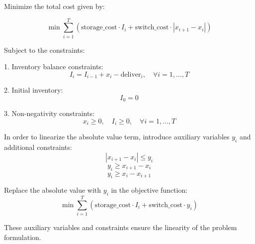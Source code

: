 \documentclass{article}
\begin{document}
Minimize the total cost given by:

\[
\min \sum_{i=1}^{T} \left( \text{storage\_cost} \cdot I_i + \text{switch\_cost} \cdot |x_{i+1} - x_i| \right)
\]

Subject to the constraints:

1. Inventory balance constraints:
   \[
   I_i = I_{i-1} + x_i - \text{deliver}_i, \quad \forall i = 1, \ldots, T
   \]

2. Initial inventory:
   \[
   I_0 = 0
   \]

3. Non-negativity constraints:
   \[
   x_i \geq 0, \quad I_i \geq 0, \quad \forall i = 1, \ldots, T
   \]

In order to linearize the absolute value term, introduce auxiliary variables \( y_i \) and additional constraints:
\[
|x_{i+1} - x_i| \leq y_i
\]
\[
y_i \geq x_{i+1} - x_i
\]
\[
y_i \geq x_i - x_{i+1}
\]

Replace the absolute value with \( y_i \) in the objective function:
\[
\min \sum_{i=1}^{T} \left( \text{storage\_cost} \cdot I_i + \text{switch\_cost} \cdot y_i \right)
\]

These auxiliary variables and constraints ensure the linearity of the problem formulation.
\end{document}
